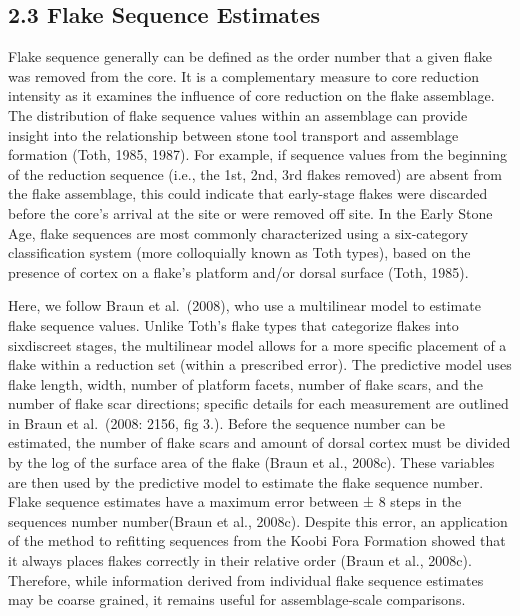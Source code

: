 \documentclass[]{elsarticle} %
\begin{document}
\hypertarget{flake-sequence-estimates}{%
\subsection{2.3 Flake Sequence
Estimates}\label{flake-sequence-estimates}}

Flake sequence generally can be defined as the order number that a given
flake was removed from the core. It is a complementary measure to core
reduction intensity as it examines the influence of core reduction on
the flake assemblage. The distribution of flake sequence values within
an assemblage can provide insight into the relationship between stone
tool transport and assemblage formation (\hspace{0pt}Toth,
1985\hspace{0pt}, \hspace{0pt}1987\hspace{0pt}). For example, if
sequence values from the beginning of the reduction sequence (i.e., the
1st, 2nd, 3rd flakes removed) are absent from the flake assemblage, this
could indicate that early-stage flakes were discarded before the core's
arrival at the site or were removed off site. In the Early Stone Age,
flake sequences are most commonly characterized using a six-category
classification system (more colloquially known as Toth types), based on
the presence of cortex on a flake's platform and/or dorsal surface
(\hspace{0pt}Toth, 1985\hspace{0pt}).

Here, we follow Braun et al.~(2008), who use a multilinear model to
estimate flake sequence values. Unlike Toth's flake types that
categorize flakes into sixdiscreet stages, the multilinear model allows
for a more specific placement of a flake within a reduction set (within
a prescribed error). The predictive model uses flake length, width,
number of platform facets, number of flake scars, and the number of
flake scar directions; specific details for each measurement are
outlined in Braun et al.~(2008: 2156, fig 3.). Before the sequence
number can be estimated, the number of flake scars and amount of dorsal
cortex must be divided by the log of the surface area of the flake
(\hspace{0pt}Braun et al., 2008c\hspace{0pt}). These variables are then
used by the predictive model to estimate the flake sequence number.
Flake sequence estimates have a maximum error between ± 8 steps in the
sequences number number(\hspace{0pt}Braun et al., 2008c\hspace{0pt}).
Despite this error, an application of the method to refitting sequences
from the Koobi Fora Formation showed that it always places flakes
correctly in their relative order (\hspace{0pt}Braun et al.,
2008c\hspace{0pt}). Therefore, while information derived from individual
flake sequence estimates may be coarse grained, it remains useful for
assemblage-scale comparisons.
\end{document}
